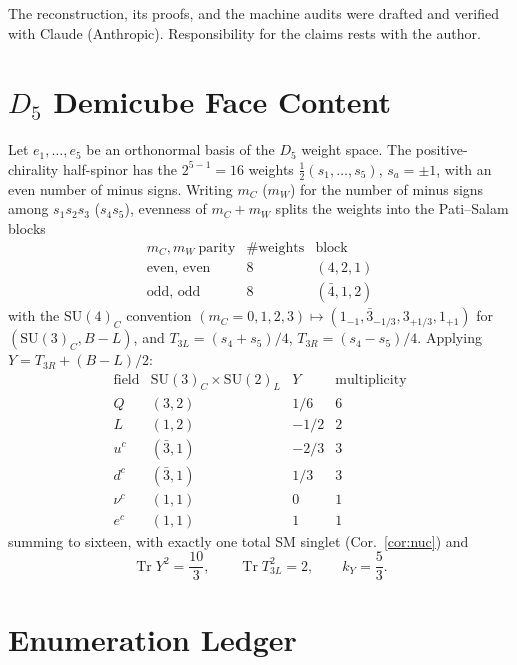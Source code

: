 \documentclass[
  aps,
  prd,
  preprint,
  nofootinbib,
  superscriptaddress,
  longbibliography
]{revtex4-2}
\newcommand{\SU}{\mathrm{SU}}
\DeclareMathOperator{\Tr}{Tr}
\begin{document}
\begin{acknowledgments}
The reconstruction, its proofs, and the machine audits were drafted and
verified with Claude (Anthropic).  Responsibility for the claims rests with
the author.
\end{acknowledgments}

\appendix

\section{\texorpdfstring{\(D_5\) Demicube Face Content}{D5 Demicube Face Content}}
\label{app:demicube}

Let \(e_1,\ldots,e_5\) be an orthonormal basis of the \(D_5\) weight space.
The positive-chirality half-spinor has the \(2^{5-1}=16\) weights
\(\frac12(s_1,\ldots,s_5)\), \(s_a=\pm1\), with an even number of minus
signs.  Writing \(m_C\) (\(m_W\)) for the number of minus signs among
\(s_1s_2s_3\) (\(s_4s_5\)), evenness of \(m_C+m_W\) splits the weights into
the Pati--Salam blocks
\[
\begin{array}{c|c|c}
m_C,m_W\ \text{parity} & \#\text{weights} & \text{block}\\
\hline
\text{even, even} & 8 & (4,2,1)\\
\text{odd, odd} & 8 & (\bar4,1,2)
\end{array}
\]
with the \(\SU(4)_C\) convention
\((m_C=0,1,2,3)\mapsto(1_{-1},\bar3_{-1/3},3_{+1/3},1_{+1})\) for
\((\SU(3)_C,B-L)\), and \(T_{3L}=(s_4+s_5)/4\), \(T_{3R}=(s_4-s_5)/4\).
Applying \(Y=T_{3R}+(B-L)/2\):
\[
\begin{array}{c|c|c|c}
\text{field} & \SU(3)_C\times\SU(2)_L & Y & \text{multiplicity}\\
\hline
Q & (3,2) & 1/6 & 6\\
L & (1,2) & -1/2 & 2\\
u^c & (\bar3,1) & -2/3 & 3\\
d^c & (\bar3,1) & 1/3 & 3\\
\nu^c & (1,1) & 0 & 1\\
e^c & (1,1) & 1 & 1
\end{array}
\]
summing to sixteen, with exactly one total SM singlet
(Cor.~\ref{cor:nuc}) and
\[
  \Tr Y^2=\frac{10}{3},\qquad
  \Tr T_{3L}^2=2,\qquad
  k_Y=\frac53 .
\]

\section{Enumeration Ledger}
\label{app:enumeration}
\end{document}
